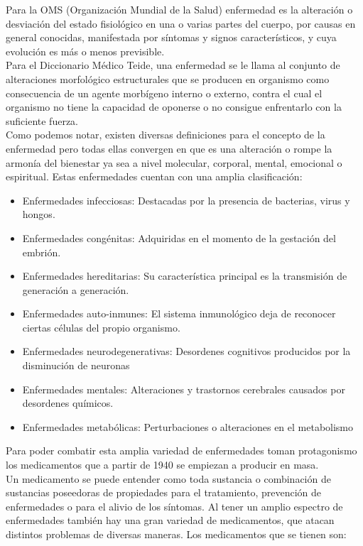 Para la OMS (Organización Mundial de la Salud) enfermedad es la alteración o desviación del estado fisiológico en una o varias partes del cuerpo, por causas en general conocidas, manifestada por síntomas y signos característicos, y cuya evolución es más o menos previsible.\\
Para el Diccionario Médico Teide, una enfermedad se le llama al conjunto de alteraciones morfológico estructurales que se producen en organismo como consecuencia de un agente morbígeno interno o externo, contra el cual el organismo no tiene la capacidad de oponerse o no consigue enfrentarlo con la suficiente fuerza.\\
Como podemos notar, existen diversas definiciones para el concepto de la enfermedad pero todas ellas convergen en que es una alteración o rompe la armonía del bienestar ya sea a nivel molecular, corporal, mental, emocional o espiritual.
Estas enfermedades cuentan con una amplia clasificación:
\begin{itemize}
	\item Enfermedades infecciosas: Destacadas por la presencia de bacterias, virus y hongos.
	\item Enfermedades congénitas: Adquiridas en el momento de la gestación del embrión.
	\item Enfermedades hereditarias: Su característica principal es la transmisión de generación a generación.
	\item Enfermedades auto-inmunes: El sistema inmunológico deja de reconocer ciertas células del propio organismo.
	\item Enfermedades neurodegenerativas: Desordenes cognitivos producidos por la disminución de neuronas 
	\item Enfermedades mentales: Alteraciones y trastornos cerebrales causados por desordenes químicos.
	\item Enfermedades metabólicas: Perturbaciones o alteraciones en el metabolismo
\end{itemize} 
Para poder combatir esta amplia variedad de enfermedades toman protagonismo los medicamentos que a partir de 1940 se empiezan a producir en masa.\\
Un medicamento se puede entender como toda sustancia o combinación de sustancias poseedoras de propiedades para el tratamiento, prevención de enfermedades o para el alivio de los síntomas.
Al tener un amplio espectro de enfermedades también hay una gran variedad de medicamentos, que atacan distintos problemas de diversas maneras.
Los medicamentos que se tienen son:
